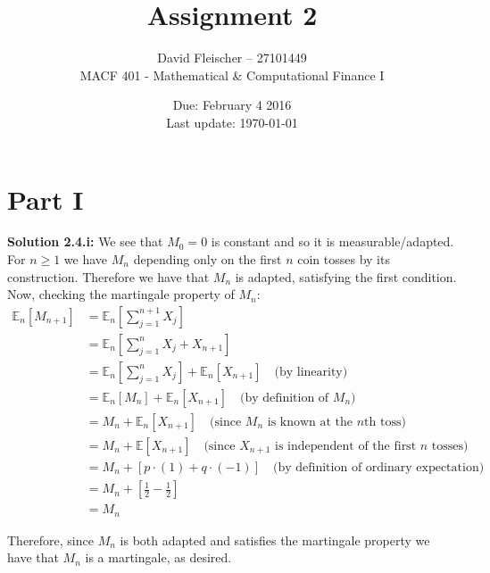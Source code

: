 \documentclass[12pt]{article}
\newlength\tindent
\renewcommand{\indent}{\hspace*{\tindent}}
\newcommand{\E}{\mathbb E}
\begin{document}
 
 
\title{Assignment 2}
\author{David Fleischer -- 27101449\\ 
MACF 401 - Mathematical \& Computational Finance I}
\date{Due: February 4 2016 \\ Last update: \today{}}
\maketitle

\section*{Part I}

{\bf Solution 2.4.i:} We see that $M_0 = 0$ is constant and so it is measurable/adapted. For $n \geq 1$ we have $M_n$ depending only on the first $n$ coin tosses by its construction. Therefore we have that $M_n$ is adapted, satisfying the first condition. \\

Now, checking the martingale property of $M_n$:
\begin{align*}
	\E_n[M_{n + 1}] &= \E_n \left[ \sum^{n + 1}_{j = 1} X_j \right] \\
	&= \E_n \left[ \sum^{n}_{j = 1} X_j + X_{n + 1} \right] \\ 
	&= \E_n \left[ \sum^n_{j = 1} X_j \right] + \E_n \left[ X_{n + 1} \right] \quad \text{(by linearity)} \\
	&= \E_n [M_n] + \E_n \left[ X_{n + 1} \right] \quad \text{(by definition of $M_n$)} \\
	&= M_n + \E_n \left[ X_{n + 1} \right] \quad  \text{(since $M_n$ is known at the $n$th toss)} \\
	&= M_n + \E [X_{n + 1}] \quad \text{(since $X_{n + 1}$ is independent of the first $n$ tosses)} \\
	&= M_n + [ p\cdot(1) + q\cdot(-1) ] \quad \text{(by definition of ordinary expectation)} \\
	&= M_n + \left[ \frac{1}{2} - \frac{1}{2} \right] \\
	&= M_n
\end{align*}

\indent Therefore, since $M_n$ is both adapted and satisfies the martingale property we have that $M_n$ is a martingale, as desired. \\
\end{document}

